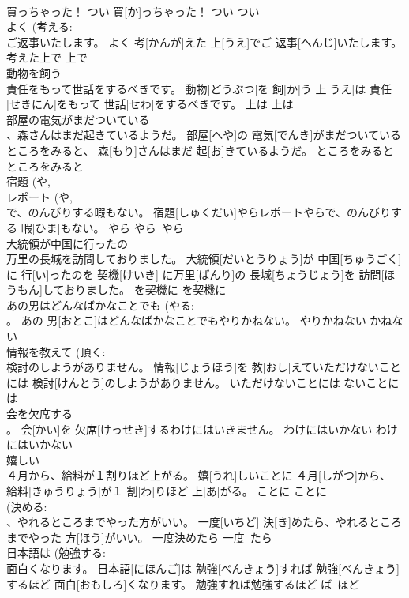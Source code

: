 \documentclass[8pt]{extreport}
\begin{document}
\begin{CJK}{UTF8}{min}
\\	買っちゃった！	つい 買[か]っちゃった！	つい	つい~	
\\	よく (考える: 
\\	ご返事いたします。	よく 考[かんが]えた 上[うえ]でご 返事[へんじ]いたします。	考えた上で	上で	
\\	動物を飼う 
\\	責任をもって世話をするべきです。	動物[どうぶつ]を 飼[か]う 上[うえ]は 責任[せきにん]をもって 世話[せわ]をするべきです。	上は	上は	
\\	部屋の電気がまだついている 
\\	、森さんはまだ起きているようだ。	部屋[へや]の 電気[でんき]がまだついているところをみると、 森[もり]さんはまだ 起[お]きているようだ。	ところをみると	ところをみると	
\\	宿題 (や, 
\\	レポート (や, 
\\	で、のんびりする暇もない。	宿題[しゅくだい]やらレポートやらで、のんびりする 暇[ひま]もない。	やら	やら~やら	
\\	大統領が中国に行ったの 
\\	万里の長城を訪問しておりました。	大統領[だいとうりょう]が 中国[ちゅうごく]に 行[い]ったのを 契機[けいき] に万里[ばんり]の 長城[ちょうじょう]を 訪問[ほうもん]しておりました。	を契機に	を契機に	
\\	あの男はどんなばかなことでも (やる: 
\\	。	あの 男[おとこ]はどんなばかなことでもやりかねない。	やりかねない	かねない	
\\	情報を教えて (頂く: 
\\	検討のしようがありません。	情報[じょうほう]を 教[おし]えていただけないことには 検討[けんとう]のしようがありません。	いただけないことには	ないことには	
\\	会を欠席する 
\\	。	会[かい]を 欠席[けっせき]するわけにはいきません。	わけにはいかない	わけにはいかない	
\\	嬉しい 
\\	４月から、給料が１割りほど上がる。	嬉[うれ]しいことに ４月[しがつ]から、 給料[きゅうりょう]が１ 割[わ]りほど 上[あ]がる。	ことに	ことに	
\\	(決める: 
\\	、やれるところまでやった方がいい。	一度[いちど] 決[き]めたら、やれるところまでやった 方[ほう]がいい。	一度決めたら	一度~たら~	
\\	日本語は (勉強する: 
\\	面白くなります。	日本語[にほんご]は 勉強[べんきょう]すれば 勉強[べんきょう]するほど 面白[おもしろ]くなります。	勉強すれば勉強するほど	ば~ほど	

\end{CJK}
\end{document}
